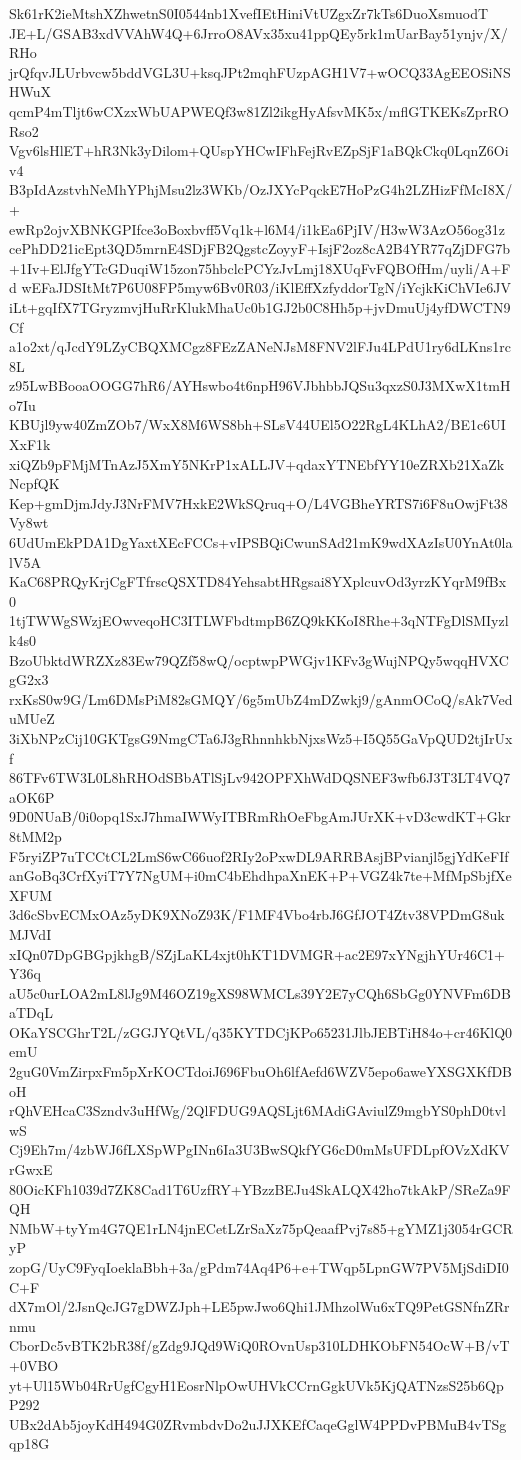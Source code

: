 Sk61rK2ieMtshXZhwetnS0I0544nb1XvefIEtHiniVtUZgxZr7kTs6DuoXsmuodT
JE+L/GSAB3xdVVAhW4Q+6JrroO8AVx35xu41ppQEy5rk1mUarBay51ynjv/X/RHo
jrQfqvJLUrbvcw5bddVGL3U+ksqJPt2mqhFUzpAGH1V7+wOCQ33AgEEOSiNSHWuX
qcmP4mTljt6wCXzxWbUAPWEQf3w81Zl2ikgHyAfsvMK5x/mflGTKEKsZprRORso2
Vgv6lsHlET+hR3Nk3yDilom+QUspYHCwIFhFejRvEZpSjF1aBQkCkq0LqnZ6Oiv4
B3pIdAzstvhNeMhYPhjMsu2lz3WKb/OzJXYcPqckE7HoPzG4h2LZHizFfMcI8X/+
ewRp2ojvXBNKGPIfce3oBoxbvff5Vq1k+l6M4/i1kEa6PjIV/H3wW3AzO56og31z
cePhDD21icEpt3QD5mrnE4SDjFB2QgstcZoyyF+IsjF2oz8cA2B4YR77qZjDFG7b
+1Iv+ElJfgYTcGDuqiW15zon75hbclcPCYzJvLmj18XUqFvFQBOfHm/uyli/A+Fd
wEFaJDSItMt7P6U08FP5myw6Bv0R03/iKlEffXzfyddorTgN/iYcjkKiChVIe6JV
iLt+gqIfX7TGryzmvjHuRrKlukMhaUc0b1GJ2b0C8Hh5p+jvDmuUj4yfDWCTN9Cf
a1o2xt/qJcdY9LZyCBQXMCgz8FEzZANeNJsM8FNV2lFJu4LPdU1ry6dLKns1rc8L
z95LwBBooaOOGG7hR6/AYHswbo4t6npH96VJbhbbJQSu3qxzS0J3MXwX1tmHo7Iu
KBUjl9yw40ZmZOb7/WxX8M6WS8bh+SLsV44UEl5O22RgL4KLhA2/BE1c6UIXxF1k
xiQZb9pFMjMTnAzJ5XmY5NKrP1xALLJV+qdaxYTNEbfYY10eZRXb21XaZkNcpfQK
Kep+gmDjmJdyJ3NrFMV7HxkE2WkSQruq+O/L4VGBheYRTS7i6F8uOwjFt38Vy8wt
6UdUmEkPDA1DgYaxtXEcFCCs+vIPSBQiCwunSAd21mK9wdXAzIsU0YnAt0lalV5A
KaC68PRQyKrjCgFTfrscQSXTD84YehsabtHRgsai8YXplcuvOd3yrzKYqrM9fBx0
1tjTWWgSWzjEOwveqoHC3ITLWFbdtmpB6ZQ9kKKoI8Rhe+3qNTFgDlSMIyzlk4s0
BzoUbktdWRZXz83Ew79QZf58wQ/ocptwpPWGjv1KFv3gWujNPQy5wqqHVXCgG2x3
rxKsS0w9G/Lm6DMsPiM82sGMQY/6g5mUbZ4mDZwkj9/gAnmOCoQ/sAk7VeduMUeZ
3iXbNPzCij10GKTgsG9NmgCTa6J3gRhnnhkbNjxsWz5+I5Q55GaVpQUD2tjIrUxf
86TFv6TW3L0L8hRHOdSBbATlSjLv942OPFXhWdDQSNEF3wfb6J3T3LT4VQ7aOK6P
9D0NUaB/0i0opq1SxJ7hmaIWWyITBRmRhOeFbgAmJUrXK+vD3cwdKT+Gkr8tMM2p
F5ryiZP7uTCCtCL2LmS6wC66uof2RIy2oPxwDL9ARRBAsjBPvianjl5gjYdKeFIf
anGoBq3CrfXyiT7Y7NgUM+i0mC4bEhdhpaXnEK+P+VGZ4k7te+MfMpSbjfXeXFUM
3d6cSbvECMxOAz5yDK9XNoZ93K/F1MF4Vbo4rbJ6GfJOT4Ztv38VPDmG8ukMJVdI
xIQn07DpGBGpjkhgB/SZjLaKL4xjt0hKT1DVMGR+ac2E97xYNgjhYUr46C1+Y36q
aU5c0urLOA2mL8lJg9M46OZ19gXS98WMCLs39Y2E7yCQh6SbGg0YNVFm6DBaTDqL
OKaYSCGhrT2L/zGGJYQtVL/q35KYTDCjKPo65231JlbJEBTiH84o+cr46KlQ0emU
2guG0VmZirpxFm5pXrKOCTdoiJ696FbuOh6lfAefd6WZV5epo6aweYXSGXKfDBoH
rQhVEHcaC3Szndv3uHfWg/2QlFDUG9AQSLjt6MAdiGAviulZ9mgbYS0phD0tvlwS
Cj9Eh7m/4zbWJ6fLXSpWPgINn6Ia3U3BwSQkfYG6cD0mMsUFDLpfOVzXdKVrGwxE
80OicKFh1039d7ZK8Cad1T6UzfRY+YBzzBEJu4SkALQX42ho7tkAkP/SReZa9FQH
NMbW+tyYm4G7QE1rLN4jnECetLZrSaXz75pQeaafPvj7s85+gYMZ1j3054rGCRyP
zopG/UyC9FyqIoeklaBbh+3a/gPdm74Aq4P6+e+TWqp5LpnGW7PV5MjSdiDI0C+F
dX7mOl/2JsnQcJG7gDWZJph+LE5pwJwo6Qhi1JMhzolWu6xTQ9PetGSNfnZRrnmu
CborDc5vBTK2bR38f/gZdg9JQd9WiQ0ROvnUsp310LDHKObFN54OcW+B/vT+0VBO
yt+Ul15Wb04RrUgfCgyH1EosrNlpOwUHVkCCrnGgkUVk5KjQATNzsS25b6QpP292
UBx2dAb5joyKdH494G0ZRvmbdvDo2uJJXKEfCaqeGglW4PPDvPBMuB4vTSgqp18G
